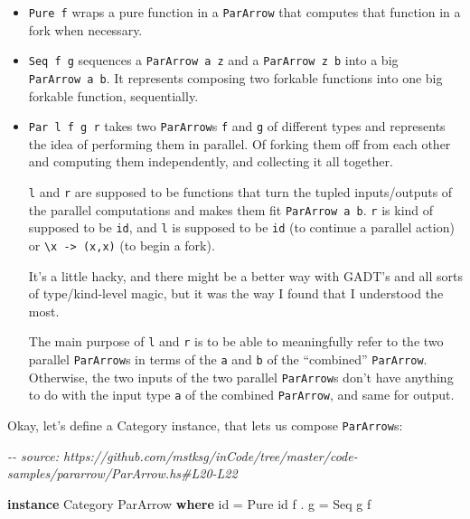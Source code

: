 \documentclass[]{article}
\newenvironment{Shaded}{}{}
\newcommand{\CommentTok}[1]{\textcolor[rgb]{0.38,0.63,0.69}{\textit{#1}}}
\newcommand{\DataTypeTok}[1]{\textcolor[rgb]{0.56,0.13,0.00}{#1}}
\newcommand{\FunctionTok}[1]{\textcolor[rgb]{0.02,0.16,0.49}{#1}}
\newcommand{\KeywordTok}[1]{\textcolor[rgb]{0.00,0.44,0.13}{\textbf{#1}}}
\newcommand{\NormalTok}[1]{#1}
\newcommand{\OperatorTok}[1]{\textcolor[rgb]{0.40,0.40,0.40}{#1}}
\newcommand{\OtherTok}[1]{\textcolor[rgb]{0.00,0.44,0.13}{#1}}
\begin{document}
\begin{itemize}
\item
  \texttt{Pure\ f} wraps a pure function in a \texttt{ParArrow} that computes
  that function in a fork when necessary.
\item
  \texttt{Seq\ f\ g} sequences a \texttt{ParArrow\ a\ z} and a
  \texttt{ParArrow\ z\ b} into a big \texttt{ParArrow\ a\ b}. It represents
  composing two forkable functions into one big forkable function, sequentially.
\item
  \texttt{Par\ l\ f\ g\ r} takes two \texttt{ParArrow}s \texttt{f} and
  \texttt{g} of different types and represents the idea of performing them in
  parallel. Of forking them off from each other and computing them
  independently, and collecting it all together.

  \texttt{l} and \texttt{r} are supposed to be functions that turn the tupled
  inputs/outputs of the parallel computations and makes them fit
  \texttt{ParArrow\ a\ b}. \texttt{r} is kind of supposed to be \texttt{id}, and
  \texttt{l} is supposed to be \texttt{id} (to continue a parallel action) or
  \texttt{\textbackslash{}x\ -\textgreater{}\ (x,x)} (to begin a fork).

  It's a little hacky, and there might be a better way with GADT's and all sorts
  of type/kind-level magic, but it was the way I found that I understood the
  most.

  The main purpose of \texttt{l} and \texttt{r} is to be able to meaningfully
  refer to the two parallel \texttt{ParArrow}s in terms of the \texttt{a} and
  \texttt{b} of the ``combined'' \texttt{ParArrow}. Otherwise, the two inputs of
  the two parallel \texttt{ParArrow}s don't have anything to do with the input
  type \texttt{a} of the combined \texttt{ParArrow}, and same for output.
\end{itemize}

Okay, let's define a Category instance, that lets us compose \texttt{ParArrow}s:

\begin{Shaded}
\begin{Highlighting}[]
\CommentTok{{-}{-} source: https://github.com/mstksg/inCode/tree/master/code{-}samples/pararrow/ParArrow.hs\#L20{-}L22}

\KeywordTok{instance} \DataTypeTok{Category} \DataTypeTok{ParArrow} \KeywordTok{where}
    \FunctionTok{id}    \OtherTok{=} \DataTypeTok{Pure} \FunctionTok{id}
\NormalTok{    f }\OperatorTok{.}\NormalTok{ g }\OtherTok{=} \DataTypeTok{Seq}\NormalTok{ g f}
\end{Highlighting}
\end{Shaded}
\end{document}
